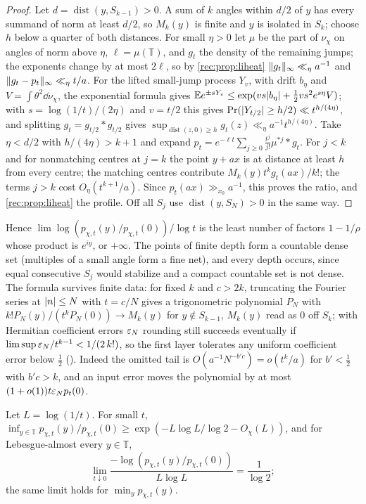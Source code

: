\begin{proof}
Let $d=\operatorname{dist}(y,S_{k-1})>0$. A sum of $k$ angles within $d/2$ of $y$ has every summand of norm at least
$d/2$, so $M_k(y)$ is finite and $y$ is isolated in $S_k$; choose $h$ below a quarter of both distances. For
small $\eta>0$ let $\mu$ be the part of $\nu_\chi$ on angles of norm above $\eta$, $\ell=\mu(\mathbb T)$, and $g_t$ the density
of the remaining jumps; the exponents change by at most $2\ell$, so by \cref{rec:prop:liheat}
$\lVert g_t\rVert_\infty\ll_\eta a^{-1}$ and $\lVert g_t-p_t\rVert_\infty\ll_\eta t/a$. For the lifted small-jump process $Y_v$, with drift
$b_\eta$ and $V=\int\theta^2\dd\nu_\chi$, the exponential formula gives
$\mathbb E e^{\pm sY_v}\le\exp(vs\lvert b_\eta\rvert+\tfrac12vs^2e^{s\eta}V)$; with $s=\log(1/t)/(2\eta)$ and $v=t/2$ this gives
$\Pr(\lvert Y_{t/2}\rvert\ge h/2)\ll t^{h/(4\eta)}$, and splitting $g_t=g_{t/2}*g_{t/2}$ gives
$\sup_{\operatorname{dist}(z,0)\ge h}g_t(z)\ll_\eta a^{-1}t^{h/(4\eta)}$. Take $\eta<d/2$ with $h/(4\eta)>k+1$ and expand
$p_t=e^{-\ell t}\sum_{j\ge0}\frac{t^j}{j!}\mu^{*j}*g_t$. For $j<k$ and for nonmatching centres at $j=k$ the point $y+ax$ is at
distance at least $h$ from every centre; the matching centres contribute $M_k(y)t^kg_t(ax)/k!$; the terms
$j>k$ cost $O_\eta(t^{k+1}/a)$. Since $p_t(ax)\gg_{x_0}a^{-1}$, this proves the ratio, and \cref{rec:prop:liheat} the
profile. Off all $S_j$ use $\operatorname{dist}(y,S_N)>0$ in the same way.
\end{proof}

Hence $\lim\log(p_{\chi,t}(y)/p_{\chi,t}(0))/\log t$ is the least number of factors $1-1/\rho$ whose product is $e^{iy}$, or
$+\infty$. The points of finite depth form a countable dense set (multiples of a small angle form a fine
net), and every depth occurs, since equal consecutive $S_j$ would stabilize and a compact countable set
is not dense. The formula survives finite data: for fixed $k$ and $c>2k$, truncating the Fourier series
at $\lvert n\rvert\le N$ with $t=c/N$ gives a trigonometric polynomial $P_N$ with $k!P_N(y)/(t^kP_N(0))\to M_k(y)$ for
$y\notin S_{k-1}$, $M_k(y)$ read as $0$ off $S_k$; with Hermitian coefficient errors $\varepsilon_N$ rounding still succeeds
eventually if $\limsup\varepsilon_N/t^{k-1}<1/(2\,k!)$, so the first layer tolerates any uniform coefficient error below
$\tfrac12$ (\stG). Indeed the omitted tail is $O(a^{-1}N^{-b'c})=o(t^k/a)$ for $b'<\tfrac12$ with $b'c>k$, and an
input error moves the polynomial by at most $(1+o(1))t\varepsilon_Np_t(0)$.

\begin{theorem}\label{rec:thm:litypical}
Let $L=\log(1/t)$. For small $t$, $\inf_{y\in\mathbb T}p_{\chi,t}(y)/p_{\chi,t}(0)\ge\exp(-L\log L/\log2-O_\chi(L))$, and for
Lebesgue-almost every $y\in\mathbb T$,
\[
 \lim_{t\downarrow0}\frac{-\log(p_{\chi,t}(y)/p_{\chi,t}(0))}{L\log L}=\frac1{\log2};
\]
the same limit holds for $\min_yp_{\chi,t}(y)$.
\end{theorem}

